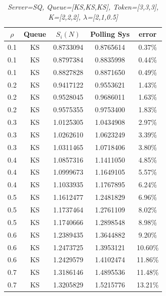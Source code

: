\documentclass[12pt,a4paper,italian]{article}
\begin{document}
\begin{table}[hb!]
\begin{minipage}[b]{0.48\linewidth}
\begin{tabular}{c c c c c}
		\end{tabular}
	
	\end{minipage}
\end{table}
\vfill
\begin{table}[ht!]
	\begin{minipage}[b]{0.48\linewidth}\centering
		\centering
		\caption{\scriptsize \emph{Server=SQ, Queue=[KS,KS,KS], Token=[3,3,3], K=[2,2,2], $\lambda$=[2,1,0.5]}}
		\label{tab3}
		\tiny
		\begin{tabular}{c c c c c}
			\hline
			$\rho$ & Queue & $S_i(N)$ & Polling Sys & error \\ \hline
		 0.1 & KS & 0.8733094 &   0.8765614    & 0.37\% \\
		 0.1 & KS & 0.8797384 &   0.8835998    & 0.44\% \\
		 0.1 & KS & 0.8827828 &   0.8871650    & 0.49\% \\ \hline \hline
		 0.2 & KS & 0.9417122 &   0.9553621    & 1.43\% \\
		 0.2 & KS & 0.9528045 &   0.9686011    & 1.63\% \\
		 0.2 & KS & 0.9575355 &   0.9753400    & 1.83\% \\ \hline \hline
		 0.3 & KS & 1.0125305 &   1.0434908    & 2.97\% \\
		 0.3 & KS & 1.0262610 &   1.0623249    & 3.39\% \\
		 0.3 & KS & 1.0311465 &   1.0718406    & 3.80\% \\ \hline \hline
		 0.4 & KS & 1.0857316 &   1.1411050    & 4.85\% \\
		 0.4 & KS & 1.0999673 &   1.1649105    & 5.57\% \\
		 0.4 & KS & 1.1033935 &   1.1767895    & 6.24\% \\ \hline \hline
		 0.5 & KS & 1.1612477 &   1.2481829    & 6.96\% \\
		 0.5 & KS & 1.1737464 &   1.2761109    & 8.02\% \\
		 0.5 & KS & 1.1740666 &   1.2898548    & 8.98\% \\ \hline \hline
		 0.6 & KS & 1.2389435 &   1.3644882    & 9.20\% \\
		 0.6 & KS & 1.2473725 &   1.3953121    & 10.60\% \\
		 0.6 & KS & 1.2429579 &   1.4102474    & 11.86\% \\ \hline \hline
		 0.7 & KS & 1.3186146 &   1.4895536    & 11.48\% \\
		 0.7 & KS & 1.3205829 &   1.5215776    & 13.21\% \\

\end{tabular}
\end{minipage}
\end{table}
\end{document}
